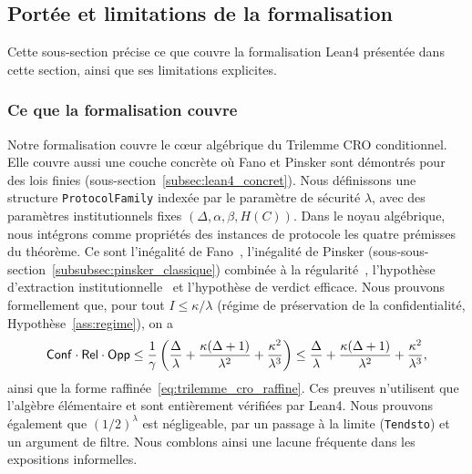 \subsection{Port\'ee et limitations de la formalisation}
\label{subsec:portee_limitations}
\begin{sloppypar}
Cette sous-section pr\'ecise ce que couvre la formalisation Lean4 pr\'esent\'ee dans
cette section, ainsi que ses limitations explicites.

\subsubsection{Ce que la formalisation couvre}
\label{subsubsec:ce_que_couvre}

Notre formalisation couvre le c\oe ur alg\'ebrique du Trilemme CRO conditionnel. Elle
couvre aussi une couche concr\`ete o\`u Fano et Pinsker sont d\'emontr\'es pour des lois
finies (sous-section~\ref{subsec:lean4_concret}).
Nous d\'efinissons une structure \texttt{ProtocolFamily} index\'ee par le
param\`etre de s\'ecurit\'e $\lambda$, avec des param\`etres institutionnels
fixes $(\Delta, \alpha, \beta, H(C))$. Dans le noyau alg\'ebrique, nous
int\'egrons comme propri\'et\'es des instances de protocole les quatre pr\'emisses
du th\'eor\`eme. Ce sont l'in\'egalit\'e de
Fano~\cite{Fano61,CoverThomas06}, l'in\'egalit\'e de Pinsker (sous-sous-section~\ref{subsubsec:pinsker_classique}) combin\'ee \`a la
r\'egularit\'e~\cite{Pinsker1964,Tsybakov2009}, l'hypoth\`ese d'extraction
institutionnelle~\cite{Simon82,Miller56} et l'hypoth\`ese de verdict efficace.
Nous prouvons formellement que, pour tout $I \le \kappa/\lambda$ (r\'egime de
pr\'eservation de la confidentialit\'e, Hypoth\`ese~\ref{ass:regime}), on a
\begin{equation}
\mathsf{Conf} \cdot \mathsf{Rel} \cdot \mathsf{Opp} \le \frac{1}{\gamma}\left(\frac{\Delta}{\lambda}
+ \frac{\kappa(\Delta+1)}{\lambda^2} + \frac{\kappa^2}{\lambda^3}\right)
\le \frac{\Delta}{\lambda}
+ \frac{\kappa(\Delta+1)}{\lambda^2} + \frac{\kappa^2}{\lambda^3},
\end{equation}
ainsi que la forme raffin\'ee~\eqref{eq:trilemme_cro_raffine}. Ces preuves
n'utilisent que l'alg\`ebre \'el\'ementaire et sont enti\`erement v\'erifi\'ees par
Lean4. Nous prouvons \'egalement que $(1/2)^\lambda$ est n\'egligeable, par un
passage \`a la limite (\texttt{Tendsto}) et un argument de filtre. Nous comblons ainsi
une lacune fr\'equente dans les expositions informelles.


\end{sloppypar}
